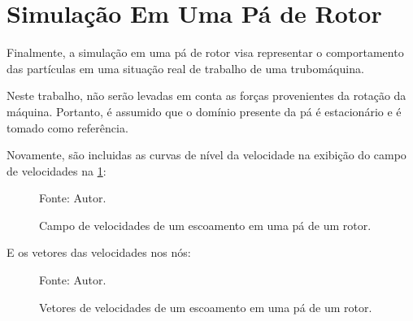 \section{\textbf{Simulação Em Uma Pá de Rotor}}
\label{sec_rotor}
Finalmente, a simulação em uma pá de rotor visa representar o comportamento das partículas em uma situação real de trabalho de uma trubomáquina.

Neste trabalho, não serão levadas em conta as forças provenientes da rotação da máquina.
Portanto, é assumido que o domínio presente da pá é estacionário e é tomado como referência.

Novamente, são incluidas as curvas de nível da velocidade na exibição do campo de velocidades na \ref{rotor_result}:
\begin{figure}[H]
    \centering
     {\raggedleft \scriptsize Fonte: Autor.}
    \caption{Campo de velocidades de um escoamento em uma pá de um rotor.}
    \label{rotor_result}
\end{figure}

E os vetores das velocidades nos nós:
\begin{figure}[H]
    \centering
     {\raggedleft \scriptsize Fonte: Autor.}
    \caption{Vetores de velocidades de um escoamento em uma pá de um rotor.}
    \label{rotor_velocity}
\end{figure}